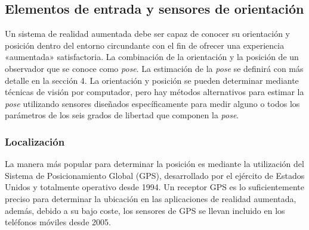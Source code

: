 
\subsection{Elementos de entrada y sensores de orientación}
Un sistema de realidad aumentada debe ser capaz de conocer su orientación y posición dentro del entorno circundante con el fin de ofrecer una experiencia «aumentada» satisfactoria. La combinación de la orientación y la posición de un observador que se conoce como \emph{pose}. La estimación de la \emph{pose} se definirá con más detalle en la sección 4. La orientación y posición se pueden determinar mediante técnicas de visión por computador, pero hay métodos alternativos para estimar la \emph{pose}  utilizando  sensores diseñados específicamente para medir alguno o todos los parámetros de los seis grados de libertad que componen la \emph{pose}.

\subsubsection{Localización}
La manera más popular para determinar la posición es mediante la utilización del Sistema de Posicionamiento Global (GPS), desarrollado por el ejército de Estados Unidos y totalmente operativo desde 1994. 
Un receptor GPS es lo suficientemente preciso para determinar la ubicación en las aplicaciones de realidad aumentada, además, debido a su bajo coste, los sensores de GPS se llevan incluido en los teléfonos móviles desde 2005.

